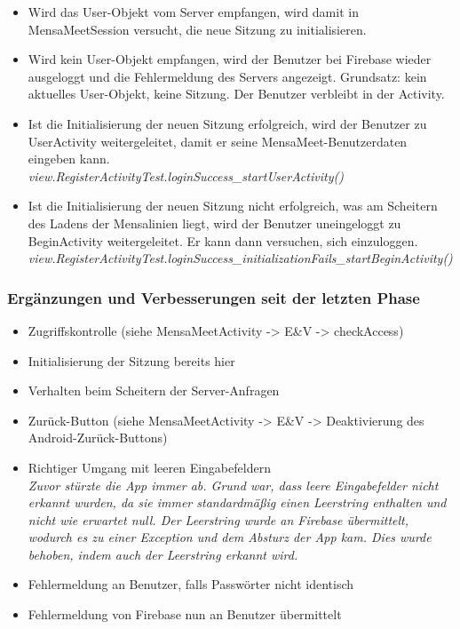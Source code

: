 \documentclass[a4paper]{scrreprt}
\begin{document}
\begin{itemize}
\item Wird das User-Objekt vom Server empfangen, wird damit in MensaMeetSession versucht, die neue Sitzung zu initialisieren.
\item Wird kein User-Objekt empfangen, wird der Benutzer bei Firebase wieder ausgeloggt und die Fehlermeldung des Servers angezeigt. Grundsatz: kein aktuelles User-Objekt, keine Sitzung. Der Benutzer verbleibt in der Activity.
\item Ist die Initialisierung der neuen Sitzung erfolgreich, wird der Benutzer zu UserActivity weitergeleitet, damit er seine MensaMeet-Benutzerdaten eingeben kann.\\
\textit{view.RegisterActivityTest.loginSuccess\_startUserActivity()}
\item Ist die Initialisierung der neuen Sitzung nicht erfolgreich, was am Scheitern des Ladens der Mensalinien liegt, wird der Benutzer uneingeloggt zu BeginActivity weitergeleitet. Er kann dann versuchen, sich einzuloggen.\\
\textit{view.RegisterActivityTest.loginSuccess\_initializationFails\_startBeginActivity()}
\end{itemize}

\subsubsection{Ergänzungen und Verbesserungen seit der letzten Phase}

\begin{itemize}
\item Zugriffskontrolle (siehe MensaMeetActivity -> E\&V -> checkAccess)
\item Initialisierung der Sitzung bereits hier
\item Verhalten beim Scheitern der Server-Anfragen
\item Zurück-Button (siehe MensaMeetActivity -> E\&V -> Deaktivierung des Android-Zurück-Buttons)
\item Richtiger Umgang mit leeren Eingabefeldern\\
\textit{Zuvor stürzte die App immer ab. Grund war, dass leere Eingabefelder nicht erkannt wurden, da sie immer standardmäßig einen Leerstring enthalten und nicht wie erwartet null. Der Leerstring wurde an Firebase übermittelt, wodurch es zu einer Exception und dem Absturz der App kam. Dies wurde behoben, indem auch der Leerstring erkannt wird.}
\item Fehlermeldung an Benutzer, falls Passwörter nicht identisch
\item Fehlermeldung von Firebase nun an Benutzer übermittelt
\end{itemize}
\end{document}
